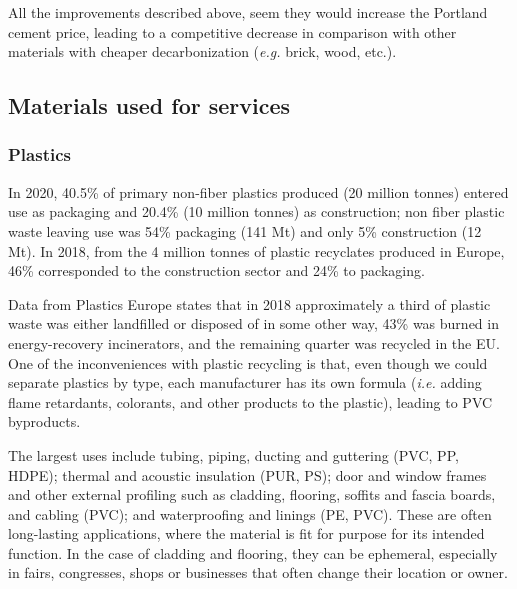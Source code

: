 \begin{enumerate}
\end{enumerate}

All the improvements described above, seem they would increase the Portland cement price, leading to a competitive decrease in comparison with other materials with cheaper decarbonization (\textit{e.g.} brick, wood, etc.).

\subsection{Materials used for services}
\label{sec:materials_used_for_services}

\subsubsection{Plastics}
\label{sec:plastics}

In 2020, 40.5\% of primary non-fiber plastics produced (20 million tonnes) entered use as packaging and 20.4\% (10 million tonnes) as construction;\autocite{plasticseurpo_2021} non fiber plastic waste leaving use was 54\% packaging (141 Mt) and only 5\% construction (12 Mt).\autocite{geyer2017production} In 2018, from the 4 million tonnes of plastic recyclates produced in Europe, 46\% corresponded to the construction sector and 24\% to packaging.\autocite{plasticseurpo_2021}

Data from Plastics Europe states that in 2018 approximately a third of plastic waste was either landfilled or disposed of in some other way, 43\% was burned in energy-recovery incinerators, and the remaining quarter was recycled in the EU.\autocite{asbp_2020} One of the inconveniences with plastic recycling is that, even though we could separate plastics by type, each manufacturer has its own formula (\textit{i.e.} adding flame retardants, colorants, and other products to the plastic), leading to PVC byproducts.\autocite{kommerling_2022}

The largest uses include tubing, piping, ducting and guttering (PVC, PP, HDPE); thermal and acoustic insulation (PUR, PS); door and window frames and other external profiling such as cladding, flooring, soffits and fascia boards, and cabling (PVC); and waterproofing and linings (PE, PVC). These are often long-lasting applications, where the material is fit for purpose for its intended function.\autocite{asbp_2020} In the case of cladding and flooring, they can be ephemeral, especially in fairs, congresses, shops or businesses that often change their location or owner.

